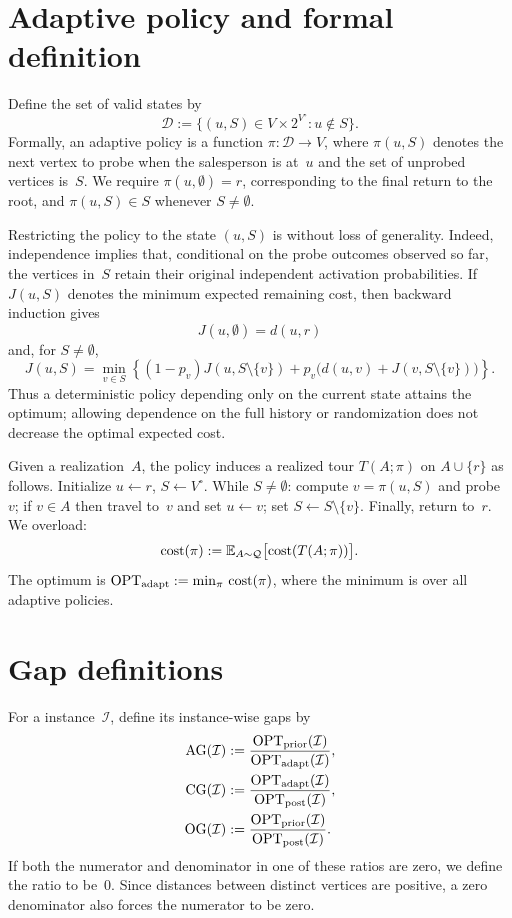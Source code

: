 \documentclass[12pt,a4paper,oneside]{report}
\begin{document}
\section{Adaptive policy and formal definition}
\label{sec:adaptive-policies}

Define the set of valid states by
\[
    \mathcal D
    :=\{(u,S)\in V\times2^{V^\circ}:u\notin S\}.
\]
Formally, an adaptive policy is a function
$\pi:\mathcal D\rightarrow V$, where
$\pi(u,S)$ denotes the next vertex to probe when the salesperson is
at~$u$ and the set of unprobed vertices is~$S$.
We require $\pi(u,\emptyset)=r$, corresponding to the final return to
the root, and $\pi(u,S)\in S$ whenever $S\ne\emptyset$.

Restricting the policy to the state $(u,S)$ is without loss of
generality.  Indeed, independence implies that, conditional on the
probe outcomes observed so far, the vertices in~$S$ retain their original
independent activation probabilities. If $J(u,S)$ denotes the
minimum expected remaining cost, then backward induction gives
\[
    J(u,\emptyset)=d(u,r)
\]
and, for $S\neq\emptyset$,
\[
    J(u,S)
    =
    \min_{v\in S}
    \left\{
        (1-p_v)J(u,S\setminus\{v\})
        +p_v\bigl(d(u,v)+J(v,S\setminus\{v\})\bigr)
    \right\}.
\]
Thus a deterministic policy depending only on the current state attains the
optimum; allowing dependence on the full history or randomization
does not decrease the optimal expected cost.

Given a realization~$A$, the policy induces a realized tour $T(A;\pi)$ on
$A\cup\{r\}$ as follows. Initialize $u \leftarrow r$, $S \leftarrow V^\circ$.
While $S \neq \emptyset$: compute $v = \pi(u,S)$ and probe~$v$; if $v \in A$
then travel to~$v$ and set $u\leftarrow v$; set
$S \leftarrow S \setminus \{v\}$. Finally, return to~$r$.
We overload:
\[
    \operatorname{cost}(\pi) := \mathbb{E}_{A\sim\mathcal Q}\bigl[\operatorname{cost}(T(A;\pi))\bigr].
\]
The optimum is $\operatorname{OPT}_\mathrm{adapt} := \min_{\pi}\,\operatorname{cost}(\pi)$, where the minimum is
over all adaptive policies.

\section{Gap definitions}\label{sec:gap-definitions}

For a \StochTSP{} instance~$\mathcal I$, define its instance-wise gaps by
\begin{align*}
    \operatorname{AG}(\mathcal I)
    &:=\frac{\operatorname{OPT}_\mathrm{prior}(\mathcal I)}{\operatorname{OPT}_\mathrm{adapt}(\mathcal I)},\\
    \operatorname{CG}(\mathcal I)
    &:=\frac{\operatorname{OPT}_\mathrm{adapt}(\mathcal I)}{\operatorname{OPT}_\mathrm{post}(\mathcal I)},\\
    \operatorname{OG}(\mathcal I)
    &:=\frac{\operatorname{OPT}_\mathrm{prior}(\mathcal I)}{\operatorname{OPT}_\mathrm{post}(\mathcal I)}.
\end{align*}
If both the numerator and denominator in one of these ratios are zero, we
define the ratio to be~$0$. Since distances between distinct vertices are
positive, a zero denominator also forces the numerator to be zero.
\end{document}
